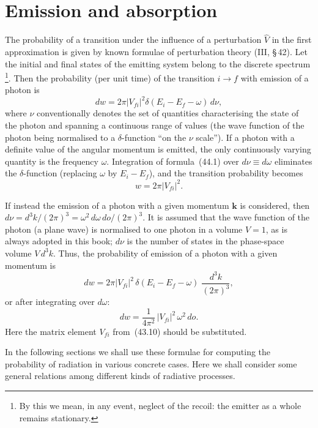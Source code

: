 \section{Emission and absorption}

The probability of a transition under the influence of a perturbation $\widehat V$ in the first approximation is given by known formulae of perturbation theory (III, \S\,42). Let the initial and final states of the emitting system belong to the discrete spectrum\,\footnote{By this we mean, in any event, neglect of the recoil: the emitter as a whole remains stationary.}. Then the probability (per unit time) of the transition $i\to f$ with emission of a photon is
\begin{equation}
dw = 2\pi|V_{fi}|^2\delta(E_i - E_f - \omega)\,d\nu,
\tag{44.1}
\end{equation}
where $\nu$ conventionally denotes the set of quantities characterising the state of the photon and spanning a continuous range of values (the wave function of the photon being normalised to a $\delta$-function ``on the $\nu$ scale''). If a photon with a definite value of the angular momentum is emitted, the only continuously varying quantity is the frequency $\omega$. Integration of formula~(44.1) over $d\nu \equiv d\omega$ eliminates the $\delta$-function (replacing $\omega$ by $E_i - E_f$), and the transition probability becomes
\begin{equation}
w = 2\pi|V_{fi}|^2.
\tag{44.2}
\end{equation}

If instead the emission of a photon with a given momentum $\mathbf{k}$ is considered, then $d\nu = d^3k/(2\pi)^3 = \omega^2\,d\omega\,do/(2\pi)^3$. It is assumed that the wave function of the photon (a plane wave) is normalised to one photon in a volume $V = 1$, as is always adopted in this book; $d\nu$ is the number of states in the phase-space volume $V\,d^3k$. Thus, the probability of emission of a photon with a given momentum is
\begin{equation}
dw = 2\pi|V_{fi}|^2\,\delta(E_i - E_f - \omega)\;\frac{d^3k}{(2\pi)^3},
\tag{44.3}
\end{equation}
or after integrating over $d\omega$:
\begin{equation}
dw = \frac{1}{4\pi^2}\,|V_{fi}|^2\,\omega^2\,do.
\tag{44.4}
\end{equation}
Here the matrix element $V_{fi}$ from~(43.10) should be substituted.

In the following sections we shall use these formulae for computing the probability of radiation in various concrete cases. Here we shall consider some general relations among different kinds of radiative processes.

